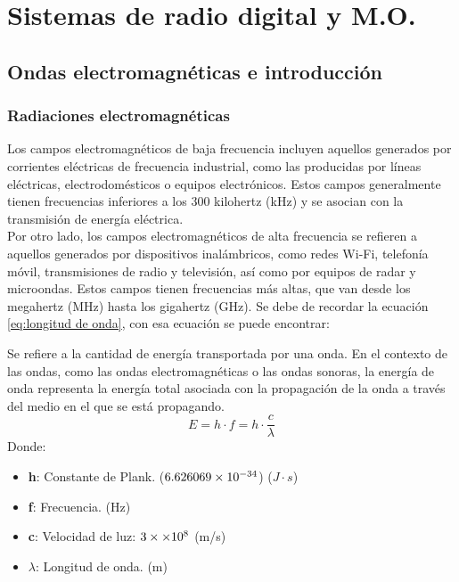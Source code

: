 \documentclass[
	12pt, %
	fleqn, %
	a4paper, %
	oneside, %
]{LegrandOrangeBook}
\begin{document}
\part{Sistemas de radio digital y M.O.}
\chapter{Ondas electromagnéticas e introducción}
\section{Radiaciones electromagnéticas}
Los campos electromagnéticos de baja frecuencia incluyen aquellos generados por corrientes eléctricas de frecuencia industrial, como las producidas por líneas eléctricas, electrodomésticos o equipos electrónicos. Estos campos generalmente tienen frecuencias inferiores a los 300 kilohertz (kHz) y se asocian con la transmisión de energía eléctrica.\\
Por otro lado, los campos electromagnéticos de alta frecuencia se refieren a aquellos generados por dispositivos inalámbricos, como redes Wi-Fi, telefonía móvil, transmisiones de radio y televisión, así como por equipos de radar y microondas. Estos campos tienen frecuencias más altas, que van desde los megahertz (MHz) hasta los gigahertz (GHz).
Se debe de recordar la ecuación \ref{eq:longitud de onda}, con esa ecuación se puede encontrar:
\begin{definition}
Se refiere a la cantidad de energía transportada por una onda. En el contexto de las ondas, como las ondas electromagnéticas o las ondas sonoras, la energía de onda representa la energía total asociada con la propagación de la onda a través del medio en el que se está propagando.
\begin{equation}
E=h\cdot f=h\cdot\frac{c}{\lambda}
\end{equation}
Donde:
\begin{itemize}
\item \textbf{h}: Constante de Plank. ($6.626069\times 10^{-34}$) ($J\cdot s$)
\item \textbf{f}: Frecuencia. (Hz)
\item \textbf{c}: Velocidad de luz: $3\times\times 10^{8}$ (m/s)
\item $\lambda$: Longitud de onda. (m)
\end{itemize}
\end{definition}
\end{document}
